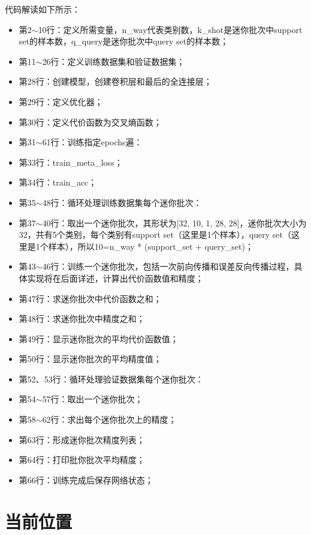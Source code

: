 代码解读如下所示：
\begin{itemize}
\item 第2$\sim$10行：定义所需变量，n\_way代表类别数，k\_shot是迷你批次中support set的样本数，q\_query是迷你批次中query set的样本数；
\item 第11$\sim$26行：定义训练数据集和验证数据集；
\item 第28行：创建模型，创建卷积层和最后的全连接层；
\item 第29行：定义优化器；
\item 第30行：定义代价函数为交叉熵函数；
\item 第31$\sim$61行：训练指定epochs遍：
\item 第33行：train\_meta\_loss；
\item 第34行：train\_acc；
\item 第35$\sim$48行：循环处理训练数据集每个迷你批次：
\item 第37$\sim$40行：取出一个迷你批次，其形状为[32, 10, 1, 28, 28]，迷你批次大小为32，共有5个类别，每个类别有support set（这里是1个样本），query set（这里是1个样本），所以10=n\_way * (support\_set + query\_set)；
\item 第43$\sim$46行：训练一个迷你批次，包括一次前向传播和误差反向传播过程，具体实现将在后面详述，计算出代价函数值和精度；
\item 第47行：求迷你批次中代价函数之和；
\item 第48行：求迷你批次中精度之和；
\item 第49行：显示迷你批次的平均代价函数值；
\item 第50行：显示迷你批次的平均精度值；
\item 第52、53行：循环处理验证数据集每个迷你批次：
\item 第54$\sim$57行：取出一个迷你批次；
\item 第58$\sim$62行：求出每个迷你批次上的精度；
\item 第63行：形成迷你批次精度列表；
\item 第64行：打印批你批次平均精度；
\item 第66行：训练完成后保存网络状态；
\end{itemize}
















\section{当前位置}




